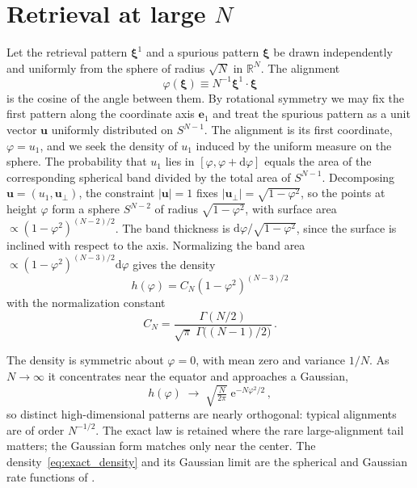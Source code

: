\documentclass[letterpaper]{article} %
\newcommand{\bxi}{\boldsymbol{\xi}}
\newcommand{\e}{{\mathrm{e}}}
\newcommand{\dd}{{\mathrm{d}}}
\begin{document}
\section{Retrieval at large $N$}
\label{sec:theory}

Let the retrieval pattern $\bxi^1$ and a spurious pattern $\bxi$ be drawn independently
and uniformly from the sphere of radius $\sqrt N$ in $\mathbb{R}^N$. The alignment
\begin{equation}
    \varphi(\bxi) \equiv N^{-1} \bxi^1\cdot\bxi
\end{equation}
is the cosine of the angle between them. By rotational symmetry we may fix the first pattern
along the coordinate axis $\bm e_1$ and treat the spurious pattern as a unit vector $\bm u$
uniformly distributed on $S^{N-1}$.
The alignment is its first coordinate, $\varphi=u_1$, and we seek the density of
$u_1$ induced by the uniform measure on the sphere.
The probability that $u_1$ lies in $[\varphi,\varphi+\dd\varphi]$ equals the area of the corresponding 
spherical band divided by the total area of $S^{N-1}$. Decomposing $\bm u=(u_1,\bm u_\perp)$, 
the constraint $|\bm u|=1$ fixes $|\bm u_\perp|=\sqrt{1-\varphi^2}$, so the points at height 
$\varphi$ form a sphere $S^{N-2}$ of radius $\sqrt{1-\varphi^2}$, with surface area
$\propto (1-\varphi^2)^{(N-2)/2}$. The band thickness is $\dd\varphi/\sqrt{1-\varphi^2}$, 
since the surface is inclined with respect to the axis. Normalizing the band area
$\propto(1-\varphi^2)^{(N-3)/2}\dd\varphi$ gives the density
\begin{equation}
h(\varphi)=C_N(1-\varphi^2)^{(N-3)/2}
\label{eq:exact_density}
\end{equation}
with the normalization constant
\begin{equation}
C_N=\frac{\Gamma(N/2)}{\sqrt\pi\;\Gamma\!\big((N-1)/2\big)}\,.
\end{equation}

The density is symmetric about $\varphi=0$, with mean zero and variance $1/N$. As $N\to\infty$ it 
concentrates near the equator and approaches a Gaussian,
\begin{equation}
    h(\varphi)\;\longrightarrow \;\sqrt{\tfrac{N}{2\pi}} \; \e^{-N\varphi^2/2}\,,
    \label{eq:gaussian} 
\end{equation}
so distinct high-dimensional patterns are nearly orthogonal: typical alignments are of order $N^{-1/2}$. 
The exact law is retained where the rare large-alignment tail matters;
the Gaussian form matches only near the center.
The density~\eqref{eq:exact_density} and its Gaussian limit are the spherical
and Gaussian rate functions of \citet{lucibello2024exponential}.
\end{document}
